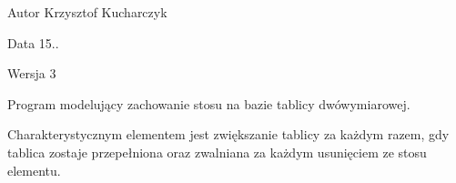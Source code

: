 \begin{DoxyAuthor}{\-Autor}
\-Krzysztof \-Kucharczyk 
\end{DoxyAuthor}
\begin{DoxyDate}{\-Data}
15.. 
\end{DoxyDate}
\begin{DoxyVersion}{\-Wersja}
3
\end{DoxyVersion}
\-Program modelujący zachowanie stosu na bazie tablicy dwówymiarowej.

\-Charakterystycznym elementem jest zwiększanie tablicy za każdym razem, gdy tablica zostaje przepełniona oraz zwalniana za każdym usunięciem ze stosu elementu. 